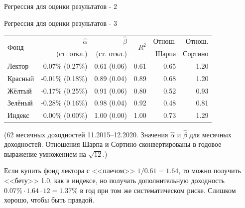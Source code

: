 \documentclass{beamer}
\begin{document}
\begin{frame}{Регрессия для оценки результатов - 2}
\center
{}
\end{frame}



\begin{frame}{Регрессия для оценки результатов - 3}
\center
\begin{tabular}{l|r|r|r|r|r}
\multirow{2}{*}{Фонд}    & $\hat{\alpha}$ & $\hat{\beta}$ & \multirow{2}{*}{$R^2$} & Отнош. & Отнош. \\
& \scriptsize{(ст. откл.)} & \scriptsize{(ст. откл.)} & & Шарпа & Сортино \\ \hline
Лектор  &  0.07\% \scriptsize{(0.27\%)} & 0.61 \scriptsize{(0.06)}   &  0.61 & 0.65 & 1.20 \\
Красный & -0.01\% \scriptsize{(0.18\%)} & 0.89 \scriptsize{(0.04)}   &  0.89 & 0.68 & 1.20 \\
Жёлтый  & -0.17\% \scriptsize{(0.25\%)} & 0.91 \scriptsize{(0.06)}   &  0.80 & 0.52 & 0.93 \\
Зелёный & -0.28\% \scriptsize{(0.16\%)} & 0.98 \scriptsize{(0.04)}   &  0.92 & 0.48 & 0.81 \\ \hline
Индекс  & 0.00\% \scriptsize{(0.00\%)}  & 1.00 \scriptsize{(0.00)}   &  1.00 & 0.73 & 1.29
\end{tabular}
\justify
{\scriptsize(62 месячных доходностей 11.2015--12.2020. Значения $\hat{\alpha}$ и $\hat{\beta}$ для месячных доходностей. Отношения Шарпа и Сортино сконвертированы в годовое выражение умножением на $\sqrt{12}$.)}

\justify
Если купить фонд лектора с <<плечом>> $1/0.61 = 1.64$, то можно получить <<бету>> 1.0, как в индексе, но получать дополнительную доходность $0.07\% \cdot 1.64 \cdot 12 = 1.37\%$ в год при том же систематическом риске. Слишком хорошо, чтобы быть правдой.
\end{frame}
\end{document}

